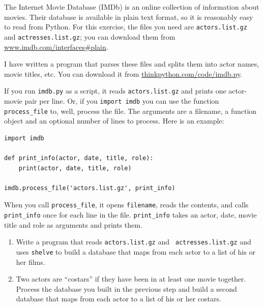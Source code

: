 \documentclass[10pt]{book}
\begin{document}
\begin{ex}


The Internet Movie Database (IMDb) is an online collection of
information about movies.  Their database is available
in plain text format, so it is reasonably easy to read from
Python.  For this exercise, the files you need
are {\tt actors.list.gz} and {\tt actresses.list.gz}; you
can download them from \url{www.imdb.com/interfaces#plain}.


I have written a program that parses these files and
splits them into actor names, movie titles, etc.  You can
download it from \url{thinkpython.com/code/imdb.py}.

If you run {\tt imdb.py} as a script, it reads {\tt actors.list.gz}
and prints one actor-movie pair per line.  Or, if you {\tt import
imdb} you can use the function \verb"process_file" to, well,
process the file.  The arguments are a filename, a function
object and an optional number of lines to process.  Here is
an example:

\beforeverb
\begin{verbatim}
import imdb

def print_info(actor, date, title, role):
    print(actor, date, title, role)

imdb.process_file('actors.list.gz', print_info)
\end{verbatim}
\afterverb

When you call \verb"process_file", it opens {\tt filename}, reads the
contents, and calls \verb"print_info" once for each line in the file.
\verb"print_info" takes an actor, date, movie title and role as
arguments and prints them.

\begin{enumerate}

\item Write a program that reads {\tt actors.list.gz} and {\tt
  actresses.list.gz} and uses {\tt shelve} to build a database
that maps from each actor to a list of his or her films.


\item Two actors are ``costars'' if they have been in at least one
  movie together.  Process the database you built in the previous step
  and build a second database that maps from each actor to a list of
  his or her costars.


\end{enumerate}
\end{ex}
\end{document}
